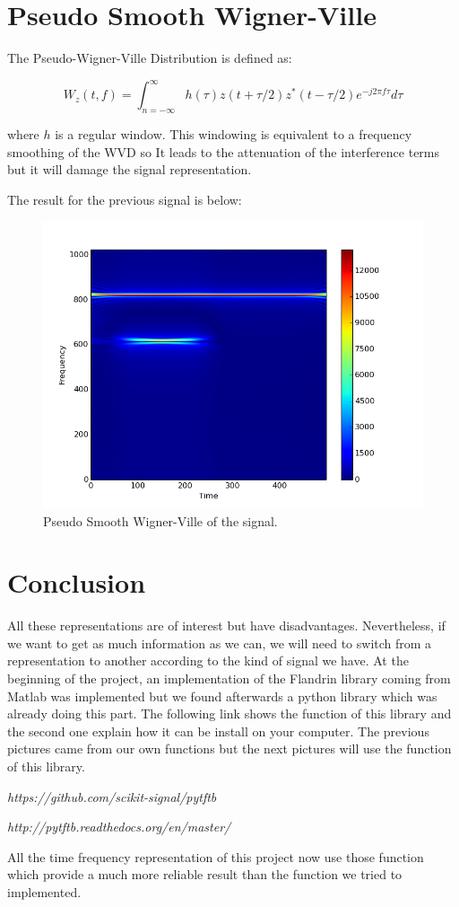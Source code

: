 \chapter{Pseudo Smooth Wigner-Ville}

The  Pseudo-Wigner-Ville Distribution is defined as:

\begin{equation}
W_z(t,f) = \int_{n=-\infty}^{\infty} h ( \tau ) z ( t + \tau / 2 ) z^* (t - \tau / 2) e^{-j 2 \pi f \tau} d \tau
\end{equation}

where $h$ is a regular window. This windowing is equivalent to a frequency smoothing of the WVD so It leads to the attenuation of the interference terms but it will damage the signal representation.

The result for the previous signal is below:

\begin{figure}[H]
\centering
    \includegraphics[scale=0.5,angle=0]{Images/SignalSimple_PSWV.png}
    \caption{Pseudo Smooth Wigner-Ville of the signal.}
    \label{fig:SignalSimple_PSWV}
\end{figure}

\chapter*{Conclusion}
\bigskip
All these representations are of interest but have disadvantages. Nevertheless, if we want to get as much information as we can, we will need to switch from a representation to another according to the kind of signal we have. At the beginning of the project, an implementation of the Flandrin library coming from Matlab was implemented but we found afterwards a python library which was already doing this part. The following link shows the function of this library and the second one explain how it can be install on your computer. The previous pictures came from our own functions but the next pictures will use the function of this library.

\medskip

\textit{https://github.com/scikit-signal/pytftb}

\medskip

\textit{http://pytftb.readthedocs.org/en/master/}

\medskip

All the time frequency representation of this project now use those function which provide a much more reliable result than the function we tried to implemented.
